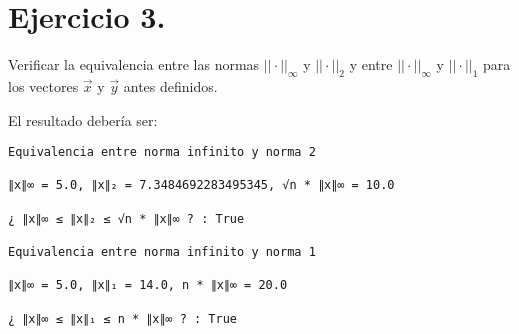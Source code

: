 \documentclass[
  letterpaper,
  DIV=11,
  numbers=noendperiod]{scrreprt}
\begin{document}
\section{\texorpdfstring{\textbf{Ejercicio
3.}}{Ejercicio 3.}}\label{ejercicio-3.}

Verificar la equivalencia entre las normas \(||\cdot||_\infty\) y
\(||\cdot||_2\) y entre \(||\cdot||_\infty\) y \(||\cdot||_1\) para los
vectores \(\vec{x}\) y \(\vec{y}\) antes definidos.

El resultado debería ser:

\begin{verbatim}
Equivalencia entre norma infinito y norma 2

∥x∥∞ = 5.0, ∥x∥₂ = 7.3484692283495345, √n * ∥x∥∞ = 10.0

¿ ∥x∥∞ ≤ ∥x∥₂ ≤ √n * ∥x∥∞ ? : True

Equivalencia entre norma infinito y norma 1

∥x∥∞ = 5.0, ∥x∥₁ = 14.0, n * ∥x∥∞ = 20.0

¿ ∥x∥∞ ≤ ∥x∥₁ ≤ n * ∥x∥∞ ? : True
\end{verbatim}
\end{document}
